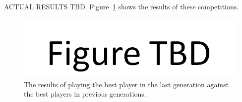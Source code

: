 ACTUAL RESULTS TBD. Figure~\ref{figure-interpopulation2} shows the results of
these competitions.

\begin{figure}[htp]
\centerline{\includegraphics[width=1.0\columnwidth]{Figures/figureTBD.png}}
\caption[Validation - Comparing population sizes]{The results of playing the
best player in the last generation against the best players in previous generations.}
\label{figure-interpopulation2}
\end{figure}
